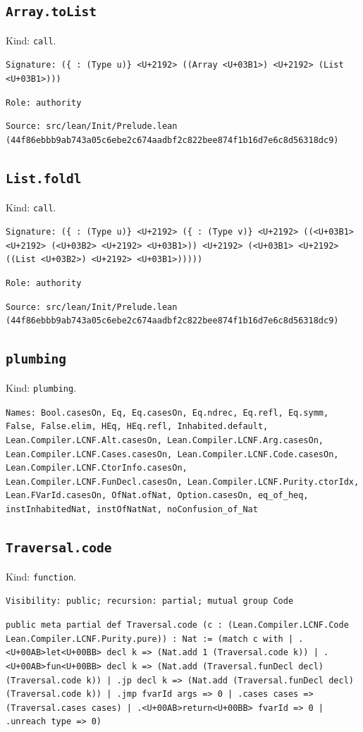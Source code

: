\documentclass[11pt]{article}
\begin{document}
\subsection*{\texttt{Array.toList}}
\noindent Kind: \texttt{call}.\par
\noindent \texttt{Signature: (\{<U+03B1> : (Type u)\} <U+2192> ((Array <U+03B1>) <U+2192> (List <U+03B1>)))}\par
\noindent \texttt{Role: authority}\par
\noindent \texttt{Source: src/lean/Init/Prelude.lean (44f86ebbb9ab743a05c6ebe2c674aadbf2c822bee874f1b16d7e6c8d56318dc9)}\par
\subsection*{\texttt{List.foldl}}
\noindent Kind: \texttt{call}.\par
\noindent \texttt{Signature: (\{<U+03B1> : (Type u)\} <U+2192> (\{<U+03B2> : (Type v)\} <U+2192> ((<U+03B1> <U+2192> (<U+03B2> <U+2192> <U+03B1>)) <U+2192> (<U+03B1> <U+2192> ((List <U+03B2>) <U+2192> <U+03B1>)))))}\par
\noindent \texttt{Role: authority}\par
\noindent \texttt{Source: src/lean/Init/Prelude.lean (44f86ebbb9ab743a05c6ebe2c674aadbf2c822bee874f1b16d7e6c8d56318dc9)}\par
\subsection*{\texttt{plumbing}}
\noindent Kind: \texttt{plumbing}.\par
\noindent \texttt{Names: Bool.casesOn, Eq, Eq.casesOn, Eq.ndrec, Eq.refl, Eq.symm, False, False.elim, HEq, HEq.refl, Inhabited.default, Lean.Compiler.LCNF.Alt.casesOn, Lean.Compiler.LCNF.Arg.casesOn, Lean.Compiler.LCNF.Cases.casesOn, Lean.Compiler.LCNF.Code.casesOn, Lean.Compiler.LCNF.CtorInfo.casesOn, Lean.Compiler.LCNF.FunDecl.casesOn, Lean.Compiler.LCNF.Purity.ctorIdx, Lean.FVarId.casesOn, OfNat.ofNat, Option.casesOn, eq\_of\_heq, instInhabitedNat, instOfNatNat, noConfusion\_of\_Nat}\par
\subsection*{\texttt{Traversal.code}}
\noindent Kind: \texttt{function}.\par
\noindent \texttt{Visibility: public; recursion: partial; mutual group Code}\par
\noindent \texttt{public meta partial def Traversal.code (c : (Lean.Compiler.LCNF.Code Lean.Compiler.LCNF.Purity.pure)) : Nat :=   (match c with | .<U+00AB>let<U+00BB> decl k => (Nat.add 1 (Traversal.code k)) | .<U+00AB>fun<U+00BB> decl k => (Nat.add (Traversal.funDecl decl) (Traversal.code k)) | .jp decl k => (Nat.add (Traversal.funDecl decl) (Traversal.code k)) | .jmp fvarId args => 0 | .cases cases => (Traversal.cases cases) | .<U+00AB>return<U+00BB> fvarId => 0 | .unreach type => 0)}\par
\end{document}
